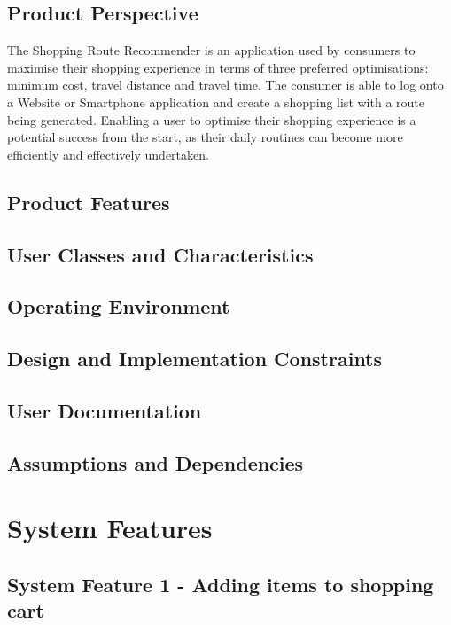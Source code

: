 \documentclass[10pt, a4paper, onecolumn]{scrartcl}
\begin{document}
			\subsection{Product Perspective}
			
			The Shopping Route Recommender is an application used by consumers to maximise their shopping experience in terms of three preferred optimisations: minimum cost, travel distance and travel time. The consumer is able to log onto a Website or Smartphone application and create a shopping list with a route being generated.  Enabling a user to optimise their shopping experience is a potential success from the start, as their daily routines can become more efficiently and effectively undertaken. 
		
		\subsection{Product Features}
		
		\subsection{User Classes and Characteristics}
		
		\subsection{Operating Environment}
		
		\subsection{Design and Implementation Constraints}
		
		\subsection{User Documentation}
		
		\subsection{Assumptions and Dependencies}
	
	\section{System Features}
	
		\subsection{System Feature 1 - Adding items to shopping cart}
		
\end{document}
